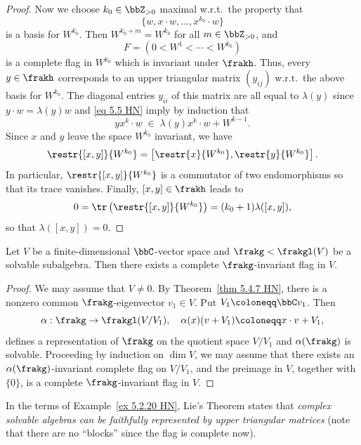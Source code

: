 \begin{proof}
    Now we choose $k_0\in\bbZ_{>0}$ maximal w.r.t.\ the property that 
    \[\{w,x\cdot w,\ldots,x^{k_0}\cdot w\}\]
    is a basis for $W^{k_0}$. Then $W^{k_0+m}=W^{k_0}$ for all $m\in\bbZ_{>0}$, and 
    \[F=(0<W^1<\cdots<W^{k_0})\]
    is a complete flag in $W^{k_0}$ which is invariant under $\frakh$. Thus, every $y\in\frakh$ corresponds to an upper triangular matrix $(y_{ij})$ w.r.t.\ the above basis for $W^{k_0}$. The diagonal entries $y_{ii}$ of this matrix are all equal to $\lambda(y)$ since $y\cdot w=\lambda(y)w$ and \eqref{eq 5.5 HN} imply by induction that 
    \[yx^k\cdot w\;\in\; \lambda(y)x^k\cdot w+W^{k-1}.\]
    Since $x$ and $y$ leave the space $W^{k_0}$ invariant, we have 
    \[\restr{[x,y]}{W^{k_0}}=\left[\restr{x}{W^{k_0}},\restr{y}{W^{k_0}}\right].\]
    In particular, $\restr{[x,y]}{W^{k_0}}$ is a commutator of two endomorphisms so that its trace vanishes. Finally, $[x,y]\in\frakh$ leads to 
    \[0=\tr\left(\restr{[x,y]}{W^{k_0}}\right)=(k_0+1)\lambda([x,y]),\]
    so that $\lambda([x,y])=0$.
\end{proof}

\begin{thm}\label{thm 5.4.8 HN Lie}\label{Theorem!Lie}
    Let $V$ be a finite-dimensional $\bbC$-vector space and $\frakg<\frakgl(V)$ be a solvable subalgebra. Then there exists a complete $\frakg$-invariant flag in $V$.
\end{thm}
\begin{proof}
    We may assume that $V\neq 0$. By Theorem~\ref{thm 5.4.7 HN}, there is a nonzero common $\frakg$-eigenvector $v_1\in V$. Put $V_1\coloneqq\bbC v_1$. Then 
    \[\alpha:\frakg\to \frakgl(V\slash V_1),\quad \alpha(x)(v+V_1)\coloneqq x\cdot v+V_1,\]
    defines a representation of $\frakg$ on the quotient space $V\slash V_1$ and $\alpha(\frakg)$ is solvable. Proceeding by induction on $\dim V$, we may assume that there exists an $\alpha(\frakg)$-invariant complete flag on $V\slash V_1$, and the preimage in $V$, together with $\{0\}$, is a complete $\frakg$-invariant flag in $V$.
\end{proof}

In the terms of Example~\ref{ex 5.2.20 HN}, Lie's Theorem states that \emph{complex solvable algebras can be faithfully represented by upper triangular matrices} (note that there are no ``blocks'' since the flag is complete now).

